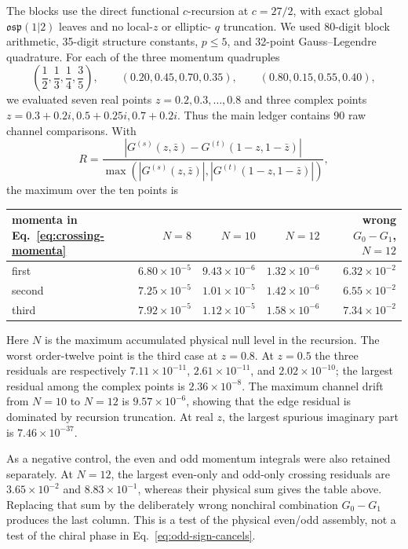 \documentclass[11pt]{article}
\begin{document}
The blocks use the direct functional \(c\)-recursion at \(c=27/2\), with
exact global \(\mathfrak{osp}(1|2)\) leaves and no local-\(z\) or elliptic-
\(q\) truncation.  We used 80-digit block arithmetic, 35-digit structure
constants, \(p\le5\), and 32-point Gauss--Legendre quadrature.  For each of
the three momentum quadruples
\begin{equation}
 \left(\frac12,\frac13,\frac14,\frac35\right),\qquad
 (0.20,0.45,0.70,0.35),\qquad
 (0.80,0.15,0.55,0.40),
 \label{eq:crossing-momenta}
\end{equation}
we evaluated seven real points \(z=0.2,0.3,\ldots,0.8\) and three complex
points \(z=0.3+0.2i,0.5+0.25i,0.7+0.2i\).  Thus the main ledger contains
90 raw channel comparisons.  With
\begin{equation}
 R=\frac{|G^{(s)}(z,\bar z)-G^{(t)}(1-z,1-\bar z)|}
 {\max(|G^{(s)}(z,\bar z)|,|G^{(t)}(1-z,1-\bar z)|)},
 \label{eq:crossing-residual}
\end{equation}
the maximum over the ten points is
\begin{center}
\begin{tabular}{@{}lrrrr@{}}
\toprule
momenta in Eq.~\eqref{eq:crossing-momenta}
 &\(N=8\)&\(N=10\)&\(N=12\)&wrong \(G_0-G_1\), \(N=12\)\\
\midrule
first  &\(6.80\times10^{-5}\)&\(9.43\times10^{-6}\)&\(1.32\times10^{-6}\)&\(6.32\times10^{-2}\)\\
second &\(7.25\times10^{-5}\)&\(1.01\times10^{-5}\)&\(1.42\times10^{-6}\)&\(6.55\times10^{-2}\)\\
third  &\(7.92\times10^{-5}\)&\(1.12\times10^{-5}\)&\(1.58\times10^{-6}\)&\(7.34\times10^{-2}\)\\
\bottomrule
\end{tabular}
\end{center}
Here \(N\) is the maximum accumulated physical null level in the recursion.
The worst order-twelve point is the third case at \(z=0.8\).  At \(z=0.5\)
the three residuals are respectively \(7.11\times10^{-11}\),
\(2.61\times10^{-11}\), and \(2.02\times10^{-10}\); the largest residual
among the complex points is \(2.36\times10^{-8}\).  The maximum channel drift
from \(N=10\) to \(N=12\) is \(9.57\times10^{-6}\), showing that the edge
residual is dominated by recursion truncation.  At real \(z\), the largest
spurious imaginary part is \(7.46\times10^{-37}\).

As a negative control, the even and odd momentum integrals were also retained
separately.  At \(N=12\), the largest even-only and odd-only crossing
residuals are \(3.65\times10^{-2}\) and \(8.83\times10^{-1}\), whereas their
physical sum gives the table above.  Replacing that sum by the deliberately
wrong nonchiral combination \(G_0-G_1\) produces the last column.  This is a
test of the physical even/odd assembly, not a test of the chiral phase in
Eq.~\eqref{eq:odd-sign-cancels}.
\end{document}
